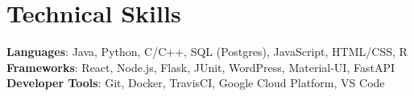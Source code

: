\documentclass[letterpaper,11pt]{article}
\begin{document}
\section{Technical Skills}
 \begin{itemize}[leftmargin=0.15in, label={}]
    \small{\item{
     \textbf{Languages}{: Java, Python, C/C++, SQL (Postgres), JavaScript, HTML/CSS, R} \\
     \textbf{Frameworks}{: React, Node.js, Flask, JUnit, WordPress, Material-UI, FastAPI} \\
     \textbf{Developer Tools}{: Git, Docker, TravisCI, Google Cloud Platform, VS Code}
    }}
 \end{itemize}
\end{document}
